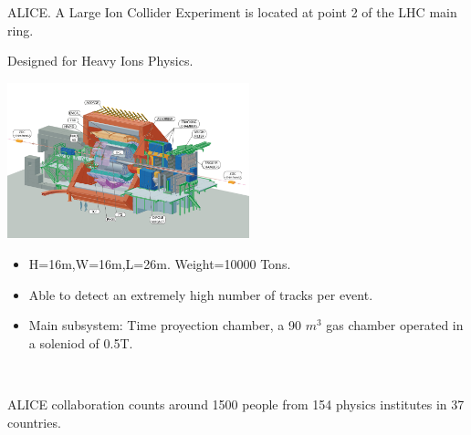 \documentclass[8pt]{beamer}
\begin{document}
\begin{frame}[fragile]{ALICE.}
A Large Ion Collider Experiment is located at point 2 of the LHC main ring.

Designed for Heavy Ions Physics.
\\
\begin{minipage}{0.7\textwidth}%
\includegraphics[width=7cm]{6}
\end{minipage}%
\hfill%
\begin{minipage}{0.3\textwidth}\raggedleft
	\begin{itemize}
		\item H=16m,W=16m,L=26m. Weight=10000 Tons.	
		\item Able to detect an extremely high number of tracks per event.
		\item Main subsystem: Time proyection chamber, a 90 $m^3$ gas chamber operated in a soleniod of 0.5T.
	\end{itemize}
\end{minipage}
\\
\vspace{0.5cm}

ALICE collaboration counts around 1500 people from 154 physics institutes in 37 countries.
\end{frame}

\end{document}
